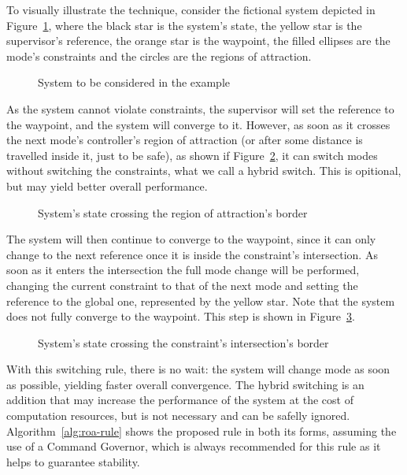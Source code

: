 To visually illustrate the technique, consider the fictional system depicted in
Figure~\ref{fig:roa-ex1}, where the black star is the system's state, the yellow
star is the supervisor's reference, the orange star is the waypoint, the filled
ellipses are the mode's constraints and the circles are the regions of
attraction.

\begin{figure}[!htb]
	\centering
	
	\caption{System to be considered in the example}%
	\label{fig:roa-ex1}
\end{figure}

As the system cannot violate constraints, the supervisor will set the reference
to the waypoint, and the system will converge to it. However, as soon as it
crosses the next mode's controller's region of attraction (or after some
distance is travelled inside it, just to be safe), as shown if
Figure~\ref{fig:roa-ex2}, it can switch modes without switching the constraints,
what we call a hybrid switch. This is opitional, but may yield better overall
performance.

\begin{figure}[!htb]
	\centering
	
	\caption{System's state crossing the region of attraction's border}%
	\label{fig:roa-ex2}
\end{figure}

The system will then continue to converge to the waypoint, since it can only
change to the next reference once it is inside the constraint's intersection. As
soon as it enters the intersection the full mode change will be performed,
changing the current constraint to that of the next mode and setting the
reference to the global one, represented by the yellow star. Note that the
system does not fully converge to the waypoint. This step is shown in
Figure~\ref{fig:roa-ex3}.

\begin{figure}[!htb]
	\centering
	
	\caption{System's state crossing the constraint's intersection's border}%
	\label{fig:roa-ex3}
\end{figure}

With this switching rule, there is no wait: the system will change mode as soon
as possible, yielding faster overall convergence. The hybrid switching is an
addition that may increase the performance of the system at the cost of
computation resources, but is not necessary and can be safelly ignored.
Algorithm~\ref{alg:roa-rule} shows the proposed rule in both its forms, assuming
the use of a Command Governor, which is always recommended for this rule as it
helps to guarantee stability.

